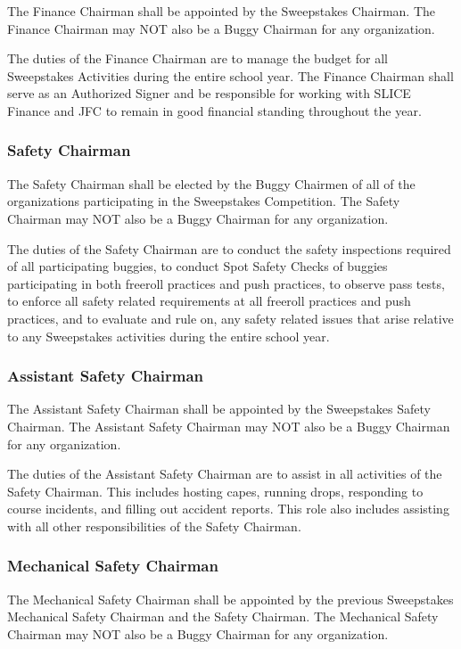 	The Finance Chairman shall be appointed by the Sweepstakes Chairman. The Finance Chairman may NOT also be a Buggy Chairman for any organization.

	The duties of the Finance Chairman are to manage the budget for all Sweepstakes Activities during the entire school year. The Finance Chairman shall serve as an Authorized Signer and be responsible for working with SLICE Finance and JFC to remain in good financial standing throughout the year.

\subsubsection{Safety Chairman}

	The Safety Chairman shall be elected by the Buggy Chairmen of all of the organizations participating in the Sweepstakes Competition. The Safety Chairman may NOT also be a Buggy Chairman for any organization.

	The duties of the Safety Chairman are to conduct the safety inspections required of all participating buggies, to conduct Spot Safety Checks of buggies participating in both freeroll practices and push practices, to observe pass tests, to enforce all safety related requirements at all freeroll practices and push practices, and to evaluate and rule on, any safety related issues that arise relative to any Sweepstakes activities during the entire school year.

\subsubsection{Assistant Safety Chairman}

	The Assistant Safety Chairman shall be appointed by the Sweepstakes Safety Chairman. The Assistant Safety Chairman may NOT also be a Buggy Chairman for any organization.

	The duties of the Assistant Safety Chairman are to assist in all activities of the Safety Chairman. This includes hosting capes, running drops, responding to course incidents, and filling out accident reports. This role also includes assisting with all other responsibilities of the Safety Chairman.

\subsubsection{Mechanical Safety Chairman}

	The Mechanical Safety Chairman shall be appointed by the previous Sweepstakes Mechanical Safety Chairman and the Safety Chairman. The Mechanical Safety Chairman may NOT also be a Buggy Chairman for any organization.

